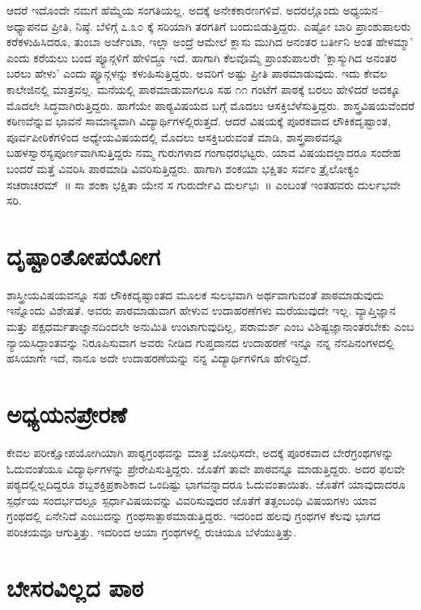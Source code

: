 ಆದರೆ ಇದೊಂದೇ ನಮಗೆ ಹೆಮ್ಮೆಯ ಸಂಗತಿಯಲ್ಲ. ಅದಕ್ಕೆ ಅನೇಕಕಾರಣಗಳಿವೆ. ಅದರಲ್ಲೊಂದು ಅಧ್ಯಯನ–ಅಧ್ಯಾಪನದ ಪ್ರೀತಿ, ನಿಷ್ಠೆ. ಬೆಳಿಗ್ಗೆ ೭.೩೦ ಕ್ಕೆ ಸರಿಯಾಗಿ ತರಗತಿಗೆ ಬಂದುಬಿಡುತ್ತಿದ್ದರು. ಎಷ್ಟೋ ಬಾರಿ ಪ್ರಾಂಶುಪಾಲರು ಕರೆಕಳುಹಿಸಿದರೂ, ತುಂಬಾ ಅರ್ಜೆಂಟಾ, ಇಲ್ಲಾ ಅಂದ್ರೆ ಆಮೇಲೆ ಕ್ಲಾಸು ಮುಗಿದ ಅನಂತರ ಬರ್ತೀನಿ ಅಂತ ಹೇಳಮ್ಮಾ’ ಎಂದು ಕರೆಯಲು ಬಂದ ಪ್ಯೂನ್ಗಳಿಗೆ ಹೇಳಿದ್ದೂ ಇದೆ. ಹಾಗಾಗಿ ಕೆಲವೊಮ್ಮೆ ಪ್ರಾಂಶುಪಾಲರೇ ’ಕ್ಲಾಸ್ಮುಗಿದ ಅನಂತರ ಬರಲು ಹೇಳು’ ಎಂದು ಪ್ಯೂನ್ಗಳನ್ನು ಕಳುಹಿಸುತ್ತಿದ್ದರು. ಅವರಿಗೆ ಅಷ್ಟು ಪ್ರೀತಿ ಪಾಠಮಾಡುವುದು. ಇದು ಕೇವಲ ಕಾಲೇಜಿನಲ್ಲಿ ಮಾತ್ರವಲ್ಲ. ಮನೆಯಲ್ಲಿ ಪಾಠಮಾಡುವಾಗಲೂ ಸಹ ೧೧ ಗಂಟೆಗೆ ಪಾಠಕ್ಕೆ ಬರಲು ಹೇಳಿದರೆ ಅದಕ್ಕೂ ಮೊದಲೇ ಸಿದ್ಧವಾಗಿರುತ್ತಿದ್ದರು.
ಹಾಗೆಯೇ ಪಾಠ್ಯವಿಷಯದ ಬಗ್ಗೆ ಮೊದಲು ಆಸಕ್ತಿಬೆಳೆಸುತ್ತಿದ್ದರು. ಶಾಸ್ತ್ರವಿಷಯವೆಂದರೆ ಕಠಿಣವೆನ್ನುವ ಭಾವನೆ ಸಾಮಾನ್ಯವಾಗಿ ವಿದ್ಯಾರ್ಥಿಗಳಲ್ಲಿರುತ್ತದೆ. ಆದರೆ ವಿಷಯಕ್ಕೆ ಪೂರಕವಾದ ಲೌಕಿಕದೃಷ್ಟಾಂತ, ಪೂರ್ವಪೀಠಿಕೆಗಳಿಂದ ಅಧ್ಯೇಯವಿಷಯದಲ್ಲಿ ಮೊದಲು ಆಸಕ್ತಿಬರುವಂತೆ ಮಾಡಿ, ಶಾಸ್ತ್ರಪಾಠವನ್ನೂ ಬಹಳಸ್ವಾರಸ್ಯಪೂರ್ಣವಾಗಿಸುತ್ತಿದ್ದರು ನಮ್ಮ ಗುರುಗಳಾದ ಗಂಗಾಧರಭಟ್ಟರು. ಯಾವ ವಿಷಯದಲ್ಲಾದರೂ ಸಂದೇಹ ಬಂದರೆ ಮತ್ತೆ ವಿವರಿಸಿ ಪಾಠಮಾಡಿ ವಿವರಿಸುತ್ತಿದ್ದರು. ಹಾಗಾಗಿ ಶಂಕಯಾ ಭಕ್ಷಿತಂ ಸರ್ವಂ ತ್ರೈಲೋಕ್ಯಂ ಸಚರಾಚರಮ್~॥ ಸಾ ಶಂಕಾ ಭಕ್ಷಿತಾ ಯೇನ ಸ ಗುರುರ್ದೇವಿ ದುರ್ಲಭಃ~॥ ಎಂಬಂತೆ ಇಂತಹವರು ದುರ್ಲಭವೇ ಸರಿ.

\section*{ದೃಷ್ಟಾಂತೋಪಯೋಗ}

ಶಾಸ್ತ್ರೀಯವಿಷಯವನ್ನೂ ಸಹ ಲೌಕಿಕದೃಷ್ಟಾಂತದ ಮೂಲಕ ಸುಲಭವಾಗಿ ಅರ್ಥವಾಗುವಂತೆ ಪಾಠಮಾಡುವುದು ಇನ್ನೊಂದು ವಿಶೇಷತೆ. ಅವರು ಪಾಠಮಾಡುವಾಗ ಹೇಳುವ ಉದಾಹರಣೆಗಳು ಮರೆಯುವುದೇ ಇಲ್ಲ. ವ್ಯಾಪ್ತಿಜ್ಞಾನ ಮತ್ತು ಪಕ್ಷಧರ್ಮತಾಜ್ಞಾನದಿಂದಲೇ ಅನುಮಿತಿ ಉಂಟಾಗುವುದಿಲ್ಲ, ಪರಾಮರ್ಶ ಎಂಬ ವಿಶಿಷ್ಟಜ್ಞಾನಾಂತರಬೇಕು ಎಂಬ ನ್ಯಾಯಸಿದ್ಧಾಂತವನ್ನು ನಿರೂಪಿಸುವಾಗ ಅವರು ನೀಡಿದ ಗುಪ್ತದಾನದ ಉದಾಹರಣೆ ಇನ್ನೂ ನನ್ನ ನೆನಪಿನಂಗಳದಲ್ಲಿ ಹಸಿಯಾಗೇ ಇದೆ, ನಾನೂ ಅದೇ ಉದಾಹರಣೆಯನ್ನು ನನ್ನ ವಿದ್ಯಾರ್ಥಿಗಳಿಗೂ ಹೇಳಿದ್ದಿದೆ.

\section*{ಅಧ್ಯಯನಪ್ರೇರಣೆ}

ಕೇವಲ ಪರೀಕ್ಷೋಪಯೋಗಿಯಾಗಿ ಪಾಠ್ಯಗ್ರಂಥವನ್ನು ಮಾತ್ರ ಬೋಧಿಸದೇ, ಅದಕ್ಕೆ ಪೂರಕವಾದ ಬೇರೆಗ್ರಂಥಗಳನ್ನು ಓದುವಂತೆಯೂ ವಿದ್ಯಾರ್ಥಿಗಳನ್ನು ಪ್ರೇರೇಪಿಸುತ್ತಿದ್ದರು. ಜೊತೆಗೆ ತಾವೇ ಪಾಠವನ್ನೂ ಮಾಡುತ್ತಿದ್ದರು. ಅದರ ಫಲವೇ ಪಠ್ಯದಲ್ಲಿಲ್ಲದಿದ್ದರೂ ಶಬ್ದಶಕ್ತಿಪ್ರಕಾಶಿಕಾದ ಒಂದಿಷ್ಟು ಭಾಗವನ್ನಾದರೂ ಓದುವಂತಾಯಿತು. ಜೊತೆಗೆ ಯಾವುದಾದರೂ ಸ್ಪರ್ಧೆಯ ಸಂದರ್ಭದಲ್ಲೂ ಸ್ಪರ್ಧಾವಿಷಯವನ್ನು ವಿವರಿಸುವುದರ ಜೊತೆಗೆ ತತ್ಸಂಬಂಧಿ ವಿಷಯಗಳು ಯಾವ ಗ್ರಂಥದಲ್ಲಿ ಏನೇನಿದೆ ಎಂಬುದನ್ನು ಗ್ರಂಥಸಾತ್ಪಾಠಮಾಡುತ್ತಿದ್ದರು. ಇದರಿಂದ ಹಲವು ಗ್ರಂಥಗಳ ಕೆಲವು ಭಾಗದ ಪರಿಚಯವೂ ಆಗುತ್ತಿತ್ತು. ಇದರಿಂದ ಆಯಾ ಗ್ರಂಥಗಳಲ್ಲಿ ರುಚಿಯೂ ಬೆಳೆಯುತ್ತಿತ್ತು.

\section*{ಬೇಸರವಿಲ್ಲದ ಪಾಠ}

